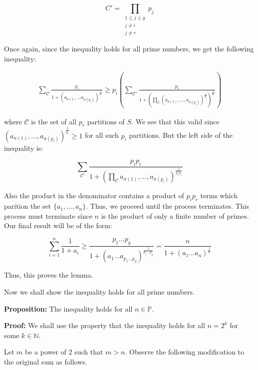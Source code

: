 \documentclass[11pt]{article}
\begin{document}
\begin{equation}
 C' = \prod_{\substack{1 \leq j \leq g \\ j \neq i \\ j \neq r}} p_j
\end{equation}

Once again, since the inequality holds for all prime numbers, we get the following inequality:

\begin{gather}
\sum_{\mathcal{C}} \frac{p_i}{1 + ( a_{\sigma(1)}...a_{\sigma(p_i)} )^{\frac{1}{p_i}}} \geq p_i(\sum_{\mathcal{C'}} \frac{p_r}{1 + ( \prod_{\mathcal{C}}(a_{\sigma(1)},...,a_{\sigma(p_i)})^{\frac{1}{p_i}})^{\frac{1}{p_r}}}) 
\end{gather}

where $\mathcal{C}$ is the set of all $p_r$ partitions of $S$. We see that this valid since $(a_{\sigma(1)},...,a_{\sigma(p_i)})^{\frac{1}{p_i}} \geq 1$ for all such $p_i$ partitions. But the left side of the inequality is:

\begin{equation}
\sum_{\mathcal{C'}} \frac{p_ip_r}{1 + ( \prod_{\mathcal{C}}a_{\sigma(1)},...,a_{\sigma(p_i)})^{\frac{1}{p_rp_i}}}
\end{equation}

Also the product in the denominator contains a product of $p_ip_r$ terms which parition the set $\{a_1,...,a_n\}$. Thus, we proceed until the process terminates. This process must terminate since $n$ is the product of only a finite number of primes.
Our final result will be of the form:

\begin{equation}
\sum_{i=1}^{n} \frac{1}{1 + a_i} \geq \frac{p_1...p_g}{1 + (a_1...a_{p_1...p_g})^{\frac{1}{p_1...p_g}}} = \frac{n}{1 + (a_1...a_{n})^{\frac{1}{n}}}
\end{equation}

Thus, this proves the lemma.

Now we shall show the inequality holds for all prime numbers. \newline

\textbf{Proposition: } The inequality holds for all $n \in  \mathbb{P}$. \newline

\textbf{Proof: } We shall use the property that the inequality holds for all $n = 2^k$ for some $k \in \mathbb{N}$.

Let $m$ be a power of 2 such that $m > n$. Observe the following modification to the original sum as follows.
\end{document}
